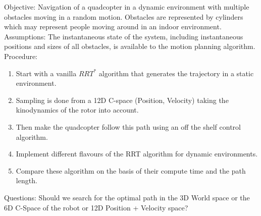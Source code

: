 Objective: Navigation of a quadcopter in a dynamic environment with multiple obstacles moving in a random motion. Obstacles are represented by cylinders which may represent people moving around in an indoor environment.\\
Assumptions: The instantaneous state of the system, including instantaneous positions and sizes of all obstacles, is available to the motion planning algorithm.\\
Procedure:
\begin{enumerate}
    \item Start with a vanilla \(RRT^*\) algorithm that generates the trajectory in a static environment.
    \item Sampling is done from a 12D C-space (Position, Velocity) taking the kinodynamics of the rotor into account.
    \item Then make the quadcopter follow this path using an off the shelf control algorithm.
    \item Implement different flavours of the RRT algorithm for dynamic environments. 
    \item Compare these algorithm on the basis of their compute time and the path length.
\end{enumerate}
Questions: Should we search for the optimal path in the 3D World space or the 6D C-Space of the robot or 12D Position + Velocity space?

